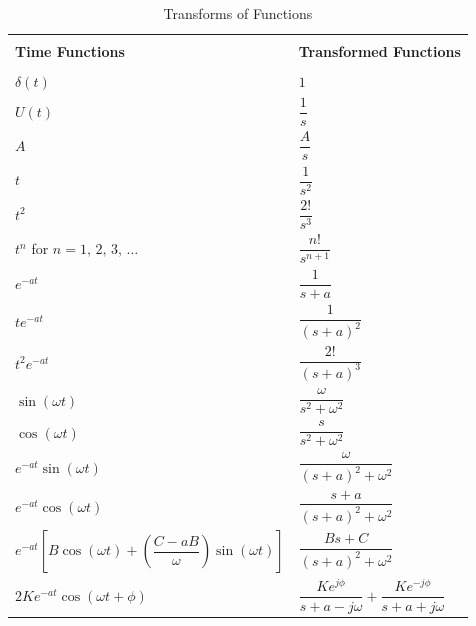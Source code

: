 \documentclass[letterpaper, 11pt]{article}
\begin{document}
\newpage
\vfill
\renewcommand{\arraystretch}{2.5}
\begin{table}
    \centering
    \caption{Transforms of Functions}
    \begin{tabular}{ll}
        \toprule
        \vspace{-50pt}\\
        \textbf{Time Functions} & \textbf{Transformed Functions}\\
        \vspace{-42.5pt}\\
        \midrule
        \(\delta(t)\) & \(1\)\\
        \(U(t)\) & \(\dfrac{1}{s}\)\\ 
        \(A\) & \(\dfrac{A}{s}\)\\
        \(t\) & \(\dfrac{1}{s^2}\)\\
        \(t^2\) & \(\dfrac{2!}{s^3}\)\\
        \(t^n\) for \(n = 1,\,2,\,3,\,\dots\) &  \(\dfrac{n!}{s^{n+1}}\)\\
        \(e^{-at}\) & \(\dfrac{1}{s+a}\)\\
        \(te^{-at}\) & \(\dfrac{1}{(s+a)^2}\)\\
        \(t^2e^{-at}\) & \(\dfrac{2!}{(s+a)^3}\)\\
        \(\sin(\omega t)\) & \(\dfrac{\omega}{s^2+\omega^2}\)\\
        \(\cos(\omega t)\) & \(\dfrac{s}{s^2+\omega^2}\)\\
        \(e^{-at}\sin(\omega t)\) & \(\dfrac{\omega}{(s+a)^2+ \omega^2}\)\\
        \(e^{-at}\cos(\omega t)\) & \(\dfrac{s+a}{(s+a)^2 + \omega^2}\)\\
        \(e^{-at}\left[B\cos(\omega t) + \left(\dfrac{C-aB}{\omega}\right)\sin(\omega t) \right]\) \hspace{10pt} & \(\dfrac{Bs + C}{(s+a)^2 + \omega^2}\)\\
        \(2Ke^{-at}\cos(\omega t  + \phi)\) & \(\dfrac{Ke^{j\phi}}{s+a-j\omega} + \dfrac{Ke^{-j\phi}}{s+a+j\omega}\)\\
        \bottomrule
    \end{tabular}        
\end{table}
\vfill
\end{document}

